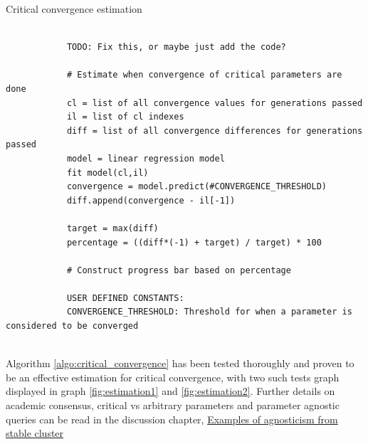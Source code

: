 \documentclass[a4paper,english]{report}
\begin{document}
		\begin{algorithm}
			\caption{Critical convergence estimation}\label{algo:critical_convergence}
			\scriptsize
			\begin{verbatim}
			
			TODO: Fix this, or maybe just add the code?
			
			# Estimate when convergence of critical parameters are done
			cl = list of all convergence values for generations passed
			il = list of cl indexes
			diff = list of all convergence differences for generations passed
			model = linear regression model
			fit model(cl,il)
			convergence = model.predict(#CONVERGENCE_THRESHOLD)
			diff.append(convergence - il[-1])
			
			target = max(diff)
			percentage = ((diff*(-1) + target) / target) * 100
			
			# Construct progress bar based on percentage
			
			USER DEFINED CONSTANTS:
			CONVERGENCE_THRESHOLD: Threshold for when a parameter is considered to be converged
			
			\end{verbatim}
		\end{algorithm}
		\clearpage
		Algorithm \ref{algo:critical_convergence} has been tested thoroughly and proven to be an effective estimation for critical convergence, with two such tests graph displayed in graph \ref{fig:estimation1} and \ref{fig:estimation2}. Further details on academic consensus, critical vs arbitrary parameters and parameter agnostic queries can be read in the discussion chapter, \hyperref[sec:agnosstable]{Examples of agnosticism from stable cluster}
\end{document}

